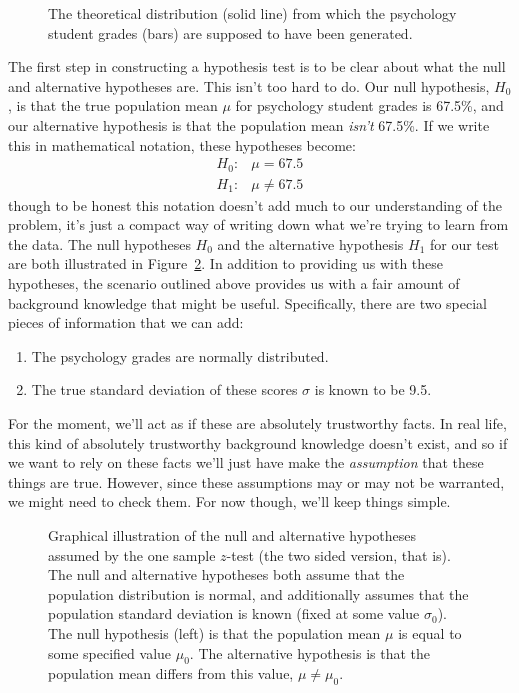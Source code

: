\begin{figure}[htb]
\begin{center}
\caption{The theoretical distribution (solid line) from which the psychology student grades (bars) are supposed to have been generated.}
\HR
\label{fig:zeppo}
\end{center}
\end{figure}


The first step in constructing a hypothesis test is to be clear about what the null and alternative hypotheses are. This isn't too hard to do. Our null hypothesis, $H_0$, is that the true population mean $\mu$ for psychology student grades is 67.5\%, and our alternative hypothesis is that the population mean {\it isn't} 67.5\%. If we write this in mathematical notation, these hypotheses become:
$$
\begin{array}{ll}
H_0: & \mu = 67.5 \\
H_1: & \mu \neq 67.5
\end{array}
$$
though to be honest this notation doesn't add much to our understanding of the problem, it's just a compact way of writing down what we're trying to learn from the data. The null hypotheses $H_0$ and the alternative hypothesis $H_1$ for our test are both illustrated in Figure~\ref{fig:ztesthyp}. In addition to providing us with these hypotheses, the scenario outlined above provides us with a fair amount of background knowledge that might be useful. Specifically, there are two special pieces of information that we can add:
\begin{enumerate} \itemsep -2pt
\item The psychology grades are normally distributed.
\item The true standard deviation of these scores $\sigma$ is known to be 9.5.
\end{enumerate}
For the moment, we'll act as if these are absolutely trustworthy facts. In real life, this kind of absolutely trustworthy background knowledge doesn't exist, and so if we want to rely on these facts we'll just have make the {\it assumption} that these things are true. However, since these assumptions may or may not be warranted, we might need to check them. For now though, we'll keep things simple.


\begin{figure}[htb]
\begin{center}
\caption{Graphical illustration of the null and alternative hypotheses assumed by the one sample $z$-test (the two sided version, that is). The null and alternative hypotheses both assume that the population distribution is normal, and additionally assumes that the population standard deviation is known (fixed at some value $\sigma_0$). The null hypothesis (left) is that the population mean $\mu$ is equal to some specified value $\mu_0$. The alternative hypothesis is that the population mean differs from this value, $\mu \neq \mu_0$.}
\HR
\label{fig:ztesthyp}
\end{center}
\end{figure}

